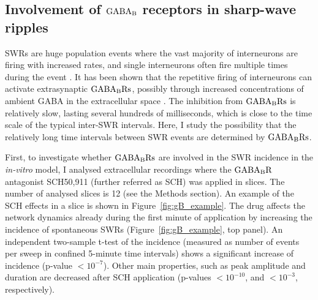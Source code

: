   \subsection{Involvement of $\rm GABA_B$ receptors in sharp-wave ripples}
    SWRs are huge population events where the vast majority of interneurons are
    firing with increased rates, and single interneurons often fire multiple
    times during the event \citep{Klausberger2009, Hajos2013}. It has been
    shown that the repetitive firing of interneurons can activate extrasynaptic
    $\rm GABA_BRs$, possibly through increased concentrations of ambient GABA
    in the extracellular space \citep{Scanziani2000, Wang2010}. The inhibition
    from $\rm GABA_B Rs$ is relatively slow, lasting several hundreds of
    milliseconds, which is close to the time scale of the typical inter-SWR
    intervals. Here, I study the possibility that the relatively long time
    intervals between SWR events are determined by $\rm GABA_B Rs$.

    First, to investigate whether $\rm GABA_BRs$ are involved in the SWR
    incidence in the {\textit{in-vitro}} model, I analysed extracellular
    recordings where the $\rm GABA_B R$ antagonist SCH50,911 (further referred
    as SCH) was applied in slices. The number of analysed slices is 12 (see the
    Methods section). An example of the SCH effects in a slice is shown in
    Figure~\ref{fig:gB_example}. The drug affects the network dynamics already
    during the first minute of application by increasing the incidence of
    spontaneous SWRs (Figure~\ref{fig:gB_example}, top panel). An independent
    two-sample t-test of the incidence (measured as number of events per sweep
    in confined 5-minute time intervals) shows a significant increase of
    incidence (p-value $<10^{-7}$). Other main properties, such as peak
    amplitude and duration are decreased after SCH application (p-values
    $<10^{-10}$, and $<10^{-3}$, respectively).
    
